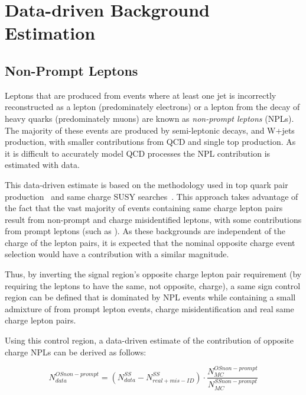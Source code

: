 
\section{Data-driven Background Estimation}\label{sec:dataDrivenBackground}

\subsection{Non-Prompt Leptons}\label{sec:NPLs}
Leptons that are produced from events where at least one jet is incorrectly reconstructed as a lepton (predominately electrons) or a lepton from the decay of heavy quarks (predominately muons) are known as \emph{non-prompt leptons} (NPLs).
The majority of these events are produced by semi-leptonic \ttbar decays, and W+jets production, with smaller contributions from QCD and single top production.
As it is difficult to accurately model QCD processes the NPL contribution is estimated with data.

This data-driven estimate is based on the methodology used in top quark pair production~\cite{CMS:2016syx} and same charge SUSY searches~\cite{CMS:2015vqc}.
This approach takes advantage of the fact that the vast majority of events containing same charge lepton pairs result from non-prompt and charge misidentified leptons, with some contributions from prompt leptons (such as \ttV).
As these backgrounds are independent of the charge of the lepton pairs, it is expected that the nominal opposite charge event selection would have a contribution with a similar magnitude.

Thus, by inverting the signal region's opposite charge lepton pair requirement (\ie by requiring the leptons to have the same, not opposite, charge), a same sign control region can be defined that is dominated by NPL events while containing a small admixture of from prompt lepton events, charge misidentification and real same charge lepton pairs.

Using this control region, a data-driven estimate of the contribution of opposite charge NPLs can be derived as follows:

\begin{equation}\label{eq:NPL}
N_{data}^{OS non-prompt} = (N_{data}^{SS} - N^{SS}_{real + mis-ID}) \cdot \frac{N_{MC}^{OS non-prompt}}{N_{MC}^{SS non-prompt}}
\end{equation}

